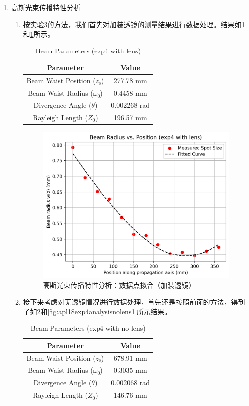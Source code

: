 \begin{enumerate}
	\item 高斯光束传播特性分析
	\begin{enumerate}
		\item 按实验3的方法，我们首先对加装透镜的测量结果进行数据处理。结果如\cref{tab:exp4-a-lens}和\cref{fig:apl18exp4analysislens}所示。
		
		\begin{table}[h!]
			\centering
			\renewcommand{\arraystretch}{1.5} %
			\caption{Beam Parameters (exp4 with lens)}
			\label{tab:exp4-a-lens}
			\begin{tabular}{|c|c|}
				\hline
				\textbf{Parameter} & \textbf{Value} \\ \hline
				Beam Waist Position ($z_0$) & 277.78 mm \\ \hline
				Beam Waist Radius ($\omega_0$) & 0.4458 mm \\ \hline
				Divergence Angle ($\theta$) & 0.002268 rad \\ \hline
				Rayleigh Length ($Z_0$) & 196.57 mm \\ \hline
			\end{tabular}
		\end{table}
		
		\begin{figure}[h!]
			\centering
			\includegraphics[width=0.6\linewidth]{images/APL1_8_exp4_analysis_lens}
			\caption{高斯光束传播特性分析：数据点拟合（加装透镜）}
			\label{fig:apl18exp4analysislens}
		\end{figure}
		
		\item 接下来考虑对无透镜情况进行数据处理，首先还是按照前面的方法，得到了如\cref{tab:exp4-a-nolens}和\cref{fig:apl18exp4analysisnolens1}所示结果。
		
		\begin{table}[h!]
			\centering
			\renewcommand{\arraystretch}{1.5} %
			\caption{Beam Parameters (exp4 with no lens)}
			\label{tab:exp4-a-nolens}
			\begin{tabular}{|c|c|}
				\hline
				\textbf{Parameter} & \textbf{Value} \\ \hline
				Beam Waist Position ($z_0$) & 678.91 mm \\ \hline
				Beam Waist Radius ($\omega_0$) & 0.3035 mm \\ \hline
				Divergence Angle ($\theta$) & 0.002068 rad \\ \hline
				Rayleigh Length ($Z_0$) & 146.76 mm \\ \hline
			\end{tabular}
		\end{table}
		

\end{enumerate}
\end{enumerate}
